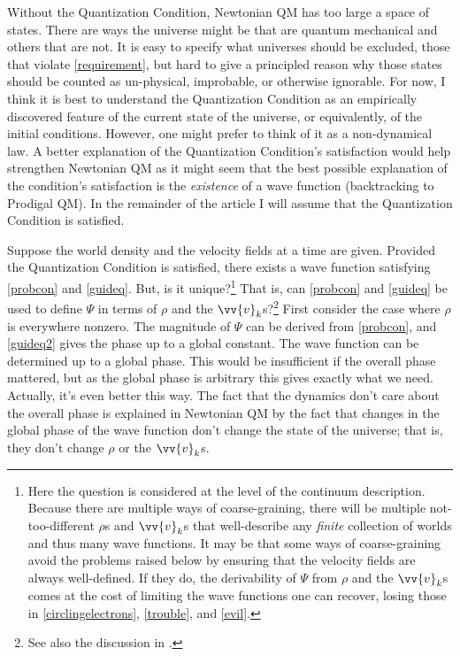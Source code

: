 \documentclass[12pt,secnumarabic,balancelastpage,amsmath,amssymb,nofootinbib]{article}
\begin{document}
Without the Quantization Condition, Newtonian QM has too large a space of states.  There are ways the universe might be that are quantum mechanical and others that are not.  It is easy to specify what universes should be excluded, those that violate \eqref{requirement}, but hard to give a principled reason why those states should be counted as un-physical, improbable, or otherwise ignorable.  For now, I think it is best to understand the Quantization Condition as an empirically discovered feature of the current state of the universe, or equivalently, of the initial conditions.  However, one might prefer to think of it as a non-dynamical law.  A better explanation of the Quantization Condition's satisfaction would help strengthen Newtonian QM as it might seem that the best possible explanation of the condition's satisfaction is the \emph{existence} of a wave function (backtracking to Prodigal QM).  In the remainder of the article I will assume that the Quantization Condition is satisfied.

Suppose the world density and the velocity fields at a time are given.  Provided the Quantization Condition is satisfied, there exists a wave function satisfying \eqref{probcon} and \eqref{guideq}.  But, is it unique?\footnote{Here the question is considered at the level of the continuum description.  Because there are multiple ways of coarse-graining, there will be multiple not-too-different $\rho$s and $\vv{v}_k$s that well-describe any \emph{finite} collection of worlds and thus many wave functions.  It may be that some ways of coarse-graining avoid the problems raised below by ensuring that the velocity fields are always well-defined.  If they do, the derivability of $\Psi$ from $\rho$ and the $\vv{v}_k$s comes at the cost of limiting the wave functions one can recover, losing those in \eqref{circlingelectrons}, \eqref{trouble}, and \eqref{evil}.}  That is, can \eqref{probcon} and \eqref{guideq} be used to define $\Psi$ in terms of $\rho$ and the $\vv{v}_k$s?\footnote{See also the discussion in \citet[][]{holland2005}.}  First consider the case where $\rho$ is everywhere nonzero.  The magnitude of $\Psi$ can be derived from \eqref{probcon}, and \eqref{guideq2} gives the phase up to a global constant.  The wave function can be determined up to a global phase.  This would be insufficient if the overall phase mattered, but as the global phase is arbitrary this gives exactly what we need.  Actually, it's even better this way.  The fact that the dynamics don't care about the overall phase is explained in Newtonian QM by the fact that changes in the global phase of the wave function don't change the state of the universe; that is, they don't change $\rho$ or the $\vv{v}_k$s.
\end{document}
